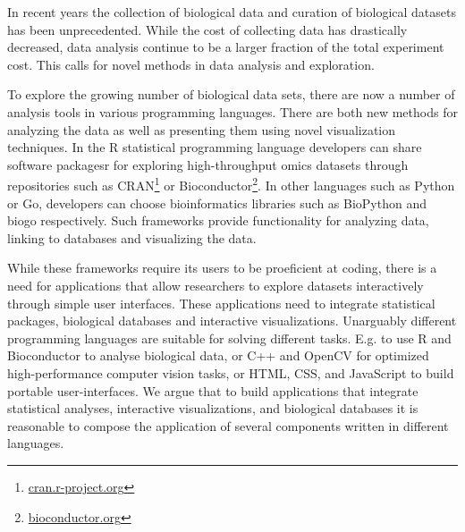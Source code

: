 
In recent years the collection of biological data and curation of biological
datasets has been unprecedented. While the cost of collecting data has
drastically decreased, data analysis continue to be a larger fraction of the
total experiment cost.\cite{sboner2011real} This calls for novel methods in data
analysis and exploration. 

To explore the growing number of biological data sets, there are now a number of
analysis tools in various programming languages. There are
both new methods for analyzing the data as well as presenting them using novel
visualization techniques. 
In the R statistical programming language developers can share software
packagesr for exploring high-throughput omics datasets through repositories such as CRAN\footnote{\url{cran.r-project.org}} or
Bioconductor\footnote{\url{bioconductor.org}}.
In other languages such as Python or Go, developers can choose bioinformatics
libraries such as BioPython\cite{biopython} and biogo\cite{biogo} respectively.
Such frameworks provide functionality for analyzing data, linking to databases
and visualizing the data. 

While these frameworks require its users to be proeficient at coding, there is a
need for applications that allow researchers to explore datasets interactively
through simple user interfaces. These applications need to integrate statistical
packages, biological databases and interactive visualizations. Unarguably
different programming languages are suitable for solving different tasks. E.g.
to use R and Bioconductor to analyse biological data, or C++ and OpenCV for
optimized high-performance computer vision tasks, or HTML, CSS, and JavaScript
to build portable user-interfaces. We argue that to build applications that
integrate statistical analyses, interactive visualizations, and biological
databases it is reasonable to compose the application of several components
written in different languages. 

